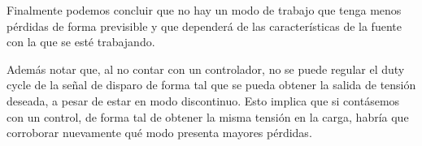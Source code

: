\documentclass[e4_tp1_main.tex]{subfiles}
\begin{document}
	Finalmente podemos concluir que no hay un modo de trabajo que tenga menos pérdidas de forma previsible y que dependerá de las características de la fuente con la que se esté trabajando. 
	
	Además notar que, al no contar con un controlador, no se puede regular el duty cycle de la señal de disparo de forma tal que se pueda obtener la salida de tensión deseada, a pesar de estar en modo discontinuo. Esto implica que si contásemos con un control, de forma tal de obtener la misma tensión en la carga, habría que corroborar nuevamente qué modo presenta mayores pérdidas.
	
\end{document}
